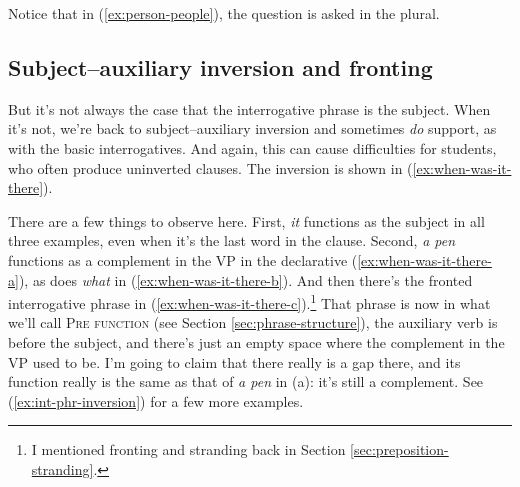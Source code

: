 Notice that in (\ref{ex:person-people}), the question is asked in the plural.

\subsection{Subject--auxiliary inversion and fronting} \label{sec:subj-aux-inversion-and-fronting}

But it's not always the case that the interrogative phrase is the subject. When it's not, we're back to subject--auxiliary inversion and sometimes \textit{do} support, as with the basic interrogatives. And again, this can cause difficulties for students, who often produce uninverted clauses. The inversion is shown in (\ref{ex:when-was-it-there}).

\ea \label{ex:when-was-it-there}
    \label{ex:when-was-it-there-a}
    \label{ex:when-was-it-there-b}
    \label{ex:when-was-it-there-c}
    \z
\z

There are a few things to observe here. First, \textit{it} functions as the subject in all three examples, even when it's the last word in the clause. Second, \textit{a pen} functions as a complement in the VP in the declarative (\ref{ex:when-was-it-there-a}), as does \textit{what} in (\ref{ex:when-was-it-there-b}). And then there's the fronted interrogative phrase in (\ref{ex:when-was-it-there-c}).\footnote{I mentioned fronting and stranding back in Section \ref{sec:preposition-stranding}.} That phrase is now in what we'll call \textsc{Pre function} (see Section \ref{sec:phrase-structure}), the auxiliary verb is before the subject, and there's just an empty space where the complement in the VP used to be. I'm going to claim that there really is a gap there, and its function really is the same as that of \textit{a pen} in (a): it's still a complement. See (\ref{ex:int-phr-inversion}) for a few more examples.

